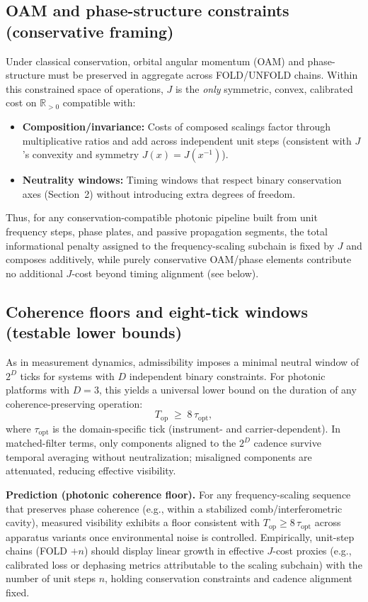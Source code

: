 \documentclass[12pt,a4paper]{article}
\begin{document}
\subsection{OAM and phase-structure constraints (conservative framing)}
Under classical conservation, orbital angular momentum (OAM) and phase-structure must be preserved in aggregate across FOLD/UNFOLD chains. Within this constrained space of operations, $J$ is the \emph{only} symmetric, convex, calibrated cost on $\mathbb{R}_{>0}$ compatible with:
\begin{itemize}
  \item \textbf{Composition/invariance:} Costs of composed scalings factor through multiplicative ratios and add across independent unit steps (consistent with $J$’s convexity and symmetry $J(x)=J(x^{-1})$).
  \item \textbf{Neutrality windows:} Timing windows that respect binary conservation axes (Section~2) without introducing extra degrees of freedom.
\end{itemize}
Thus, for any conservation-compatible photonic pipeline built from unit frequency steps, phase plates, and passive propagation segments, the total informational penalty assigned to the frequency-scaling subchain is fixed by $J$ and composes additively, while purely conservative OAM/phase elements contribute no additional $J$-cost beyond timing alignment (see below).

\subsection{Coherence floors and eight-tick windows (testable lower bounds)}
As in measurement dynamics, admissibility imposes a minimal neutral window of $2^{D}$ ticks for systems with $D$ independent binary constraints. For photonic platforms with $D=3$, this yields a universal lower bound on the duration of any coherence-preserving operation:
\[
  T_{\mathrm{op}} \;\ge\; 8\,\tau_{\mathrm{opt}},
\]
where $\tau_{\mathrm{opt}}$ is the domain-specific tick (instrument- and carrier-dependent). In matched-filter terms, only components aligned to the $2^{D}$ cadence survive temporal averaging without neutralization; misaligned components are attenuated, reducing effective visibility.

\noindent\textbf{Prediction (photonic coherence floor).} For any frequency-scaling sequence that preserves phase coherence (e.g., within a stabilized comb/interferometric cavity), measured visibility exhibits a floor consistent with $T_{\mathrm{op}}\!\ge\!8\,\tau_{\mathrm{opt}}$ across apparatus variants once environmental noise is controlled. Empirically, unit-step chains (FOLD $+n$) should display linear growth in effective $J$-cost proxies (e.g., calibrated loss or dephasing metrics attributable to the scaling subchain) with the number of unit steps $n$, holding conservation constraints and cadence alignment fixed.
\end{document}
